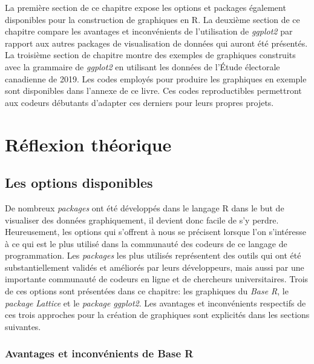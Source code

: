 \documentclass[
  letterpaper,
]{scrbook}
\begin{document}
La première section de ce chapitre expose les options et packages
également disponibles pour la construction de graphiques en R. La
deuxième section de ce chapitre compare les avantages et inconvénients
de l'utilisation de \emph{ggplot2} par rapport aux autres packages de
visualisation de données qui auront été présentés. La troisième section
de chapitre montre des exemples de graphiques construits avec la
grammaire de \emph{ggplot2} en utilisant les données de l'Étude
électorale canadienne de 2019. Les codes employés pour produire les
graphiques en exemple sont disponibles dans l'annexe de ce livre. Ces
codes reproductibles permettront aux codeurs débutants d'adapter ces
derniers pour leurs propres projets.

\hypertarget{ruxe9flexion-thuxe9orique-2}{%
\section{Réflexion théorique}\label{ruxe9flexion-thuxe9orique-2}}

\hypertarget{les-options-disponibles}{%
\subsection{Les options disponibles}\label{les-options-disponibles}}

De nombreux \emph{packages} ont été développés dans le langage R dans le
but de visualiser des données graphiquement, il devient donc facile de
s'y perdre. Heureusement, les options qui s'offrent à nous se précisent
lorsque l'on s'intéresse à ce qui est le plus utilisé dans la communauté
des codeurs de ce langage de programmation. Les \emph{packages} les plus
utilisés représentent des outils qui ont été substantiellement validés
et améliorés par leurs développeurs, mais aussi par une importante
communauté de codeurs en ligne et de chercheurs universitaires. Trois de
ces options sont présentées dans ce chapitre: les graphiques du
\emph{Base R}, le \emph{package} \emph{Lattice} et le \emph{package}
\emph{ggplot2}. Les avantages et inconvénients respectifs de ces trois
approches pour la création de graphiques sont explicités dans les
sections suivantes.

\hypertarget{avantages-et-inconvuxe9nients-de-base-r}{%
\subsubsection{Avantages et inconvénients de Base
R}\label{avantages-et-inconvuxe9nients-de-base-r}}
\end{document}

